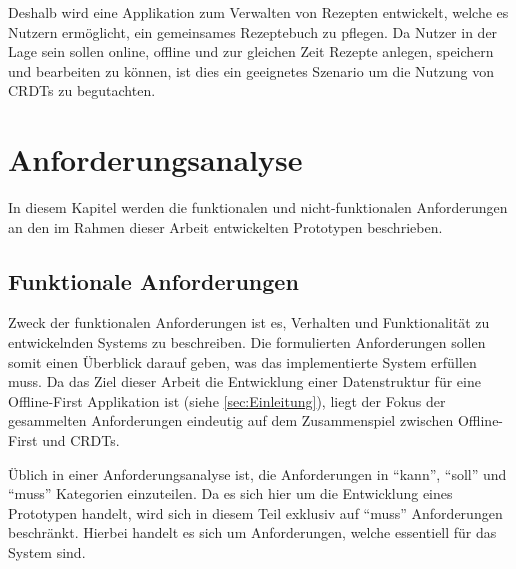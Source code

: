 \documentclass[a4paper, 12pt]{scrreprt}
\begin{document}
Deshalb wird eine Applikation zum Verwalten von Rezepten entwickelt, welche es Nutzern ermöglicht, ein gemeinsames Rezeptebuch zu pflegen. Da Nutzer in der Lage sein sollen online, offline und zur gleichen Zeit Rezepte anlegen, speichern und bearbeiten zu können, ist dies ein geeignetes Szenario um die Nutzung von CRDTs zu begutachten. 

\section{Anforderungsanalyse}

In diesem Kapitel werden die funktionalen und nicht-funktionalen Anforderungen an den im Rahmen dieser Arbeit entwickelten Prototypen beschrieben.

\subsection{Funktionale Anforderungen}
Zweck der funktionalen Anforderungen ist es, Verhalten und Funktionalität zu entwickelnden Systems zu beschreiben. Die formulierten Anforderungen sollen somit einen Überblick darauf geben, was das implementierte System erfüllen muss. Da das Ziel dieser Arbeit die Entwicklung einer Datenstruktur für eine Offline-First Applikation ist (siehe \ref{sec:Einleitung}), liegt der Fokus der gesammelten Anforderungen eindeutig auf dem Zusammenspiel zwischen Offline-First und CRDTs.

Üblich in einer Anforderungsanalyse ist, die Anforderungen in \enquote{kann}, \enquote{soll} und \enquote{muss} Kategorien einzuteilen. Da es sich hier um die Entwicklung eines Prototypen handelt, wird sich in diesem Teil exklusiv auf \enquote{muss} Anforderungen beschränkt. Hierbei handelt es sich um Anforderungen, welche essentiell für das System sind.
\end{document}
